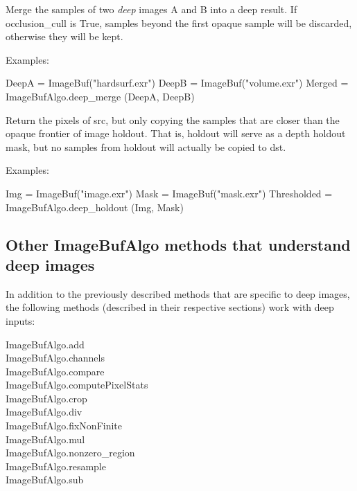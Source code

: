 Merge the samples of two \emph{deep} images {\cf A} and {\cf B} into a deep
result. If {\cf occlusion_cull} is {\cf True}, samples beyond
the first opaque sample will be discarded, otherwise they will be kept.

\smallskip
\noindent Examples:
\begin{code}
    DeepA = ImageBuf("hardsurf.exr")
    DeepB = ImageBuf("volume.exr")
    Merged = ImageBufAlgo.deep_merge (DeepA, DeepB)
\end{code}
\apiend

  

Return the pixels of {\cf src}, but only copying the
samples that are closer than the opaque frontier of image {\cf holdout}.
That is, {\cf holdout} will serve as a depth holdout mask, but no samples
from {\cf holdout} will actually be copied to {\cf dst}.

\smallskip
\noindent Examples:
\begin{code}
    Img = ImageBuf("image.exr")
    Mask = ImageBuf("mask.exr")
    Thresholded = ImageBufAlgo.deep_holdout (Img, Mask)
\end{code}
\apiend


\subsection*{Other ImageBufAlgo methods that understand deep images}

In addition to the previously described methods that are specific to
deep images, the following \ImageBufAlgo methods (described in their
respective sections) work with deep inputs:

\medskip

\noindent
{\cf ImageBufAlgo.add} \\
{\cf ImageBufAlgo.channels} \\
{\cf ImageBufAlgo.compare} \\
{\cf ImageBufAlgo.computePixelStats} \\
{\cf ImageBufAlgo.crop} \\
{\cf ImageBufAlgo.div} \\
{\cf ImageBufAlgo.fixNonFinite} \\
{\cf ImageBufAlgo.mul} \\
{\cf ImageBufAlgo.nonzero_region} \\
{\cf ImageBufAlgo.resample} \\
{\cf ImageBufAlgo.sub} \\


